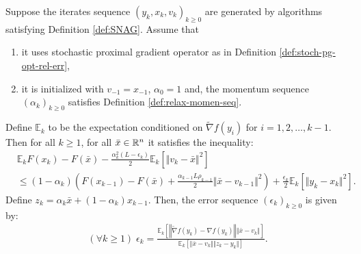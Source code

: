 \documentclass[12pt]{article}
\newcommand{\expect}{\ensuremath{\mathbb E}}
\begin{document}
        \begin{theorem}\label{thm:snag-descent}
            Suppose the iterates sequence $(y_k, x_k, v_k)_{k\ge 0}$ are generated by algorithms satisfying Definition \ref{def:SNAG}. 
            Assume that
            \begin{enumerate}[nosep]
                \item it uses stochastic proximal gradient operator as in Definition \ref{def:stoch-pg-opt-rel-err}, 
                \item it is initialized with $v_{-1} = x_{-1}$, $\alpha_0 = 1$ and, the momentum sequence $(\alpha_k)_{k \ge 0}$ satisfies Definition \ref{def:relax-momen-seq}. 
            \end{enumerate}
            Define $\expect_{k}$ to be the expectation conditioned on $\tilde \nabla f(y_i)$ for $i = 1, 2, \ldots, k - 1$. 
            Then for all $k \ge 1$, for all $\bar x \in \mathbb R^n$ it satisfies the inequality: 
            \begin{align*}
                & \expect_kF(x_k) - F(\bar x) - \frac{\alpha_k^2(L - \epsilon_k)}{2}\expect_k \left[\Vert v_k - \bar x\Vert^2\right]
                \\
                &\le 
                (1 - \alpha_k)\left(
                    F(x_{k - 1}) - F(\bar x)
                    + \frac{\alpha_{k - 1}L\rho_{k - 1}}{2}\Vert \bar x - v_{k - 1}\Vert^2
                \right) + \frac{\epsilon_k}{2}\expect_k \left[\Vert y_k - x_k \Vert^2\right].  
            \end{align*}
            Define $z_k = \alpha_k \bar x + (1 - \alpha_k)x_{k - 1}$.
            Then, the error sequence $(\epsilon_k)_{k \ge 0}$ is given by: 
            \begin{align*}
                (\forall k \ge 1)\; \epsilon_k = 
                \frac{\expect_k\left[
                    \left\Vert
                        \tilde \nabla f(y_k) - \nabla f(y_k)
                    \right\Vert
                    \Vert \bar x - v_{k}\Vert
                \right]
                }{
                    \expect_k\left[
                        \Vert \bar x - v_{k}\Vert
                        \Vert z_k - y_k\Vert
                    \right]
                }. 
            \end{align*}
        \end{theorem}
\end{document}
